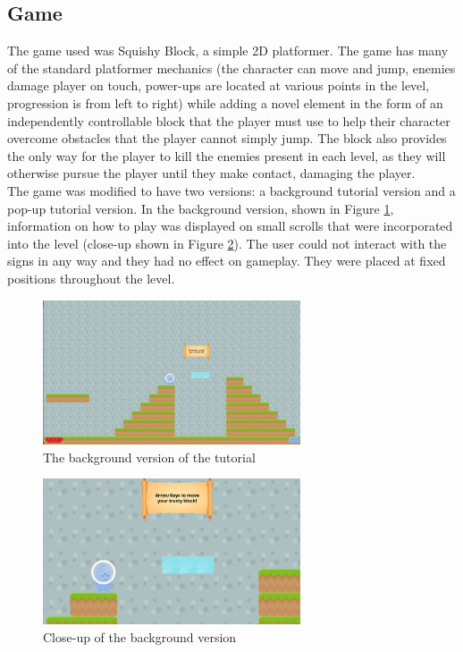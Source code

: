 \documentclass{acmsiggraph}
\begin{document}
\subsection{Game}

The game used was Squishy Block, a simple 2D platformer. The game has many of the standard platformer mechanics (the character can move and jump, enemies damage player on touch, power-ups are located at various points in the level, progression is from left to right) while adding a novel element in the form of an independently controllable block that the player must use to help their character overcome obstacles that the player cannot simply jump. The block also provides the only way for the player to kill the enemies present in each level, as they will otherwise pursue the player until they make contact, damaging the player. \\
The game was modified to have two versions: a background tutorial version and a pop-up tutorial version.
In the background version, shown in Figure \ref{fig:even}, information on how to play was displayed on small scrolls that were incorporated into the level (close-up shown in Figure \ref{fig:close}). The user could not interact with the signs in any way and they had no effect on gameplay. They were placed at fixed positions throughout the level.\\
 \begin{figure}[!b]
  \centering
  \includegraphics[width=3.0in]{images/even}
  \caption{The background version of the tutorial}
  \label{fig:even}
\end{figure}
\begin{figure}[!h]
  \centering
  \includegraphics[width=3.0in]{images/close}
  \caption{Close-up of the background version}
  \label{fig:close}
\end{figure}
\end{document}
